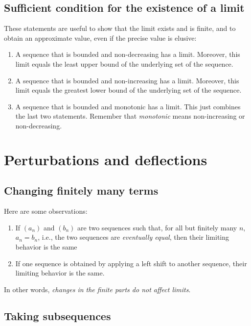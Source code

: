 \documentclass[10pt]{amsart}
\begin{document}
\subsection{Sufficient condition for the existence of a limit}

These statements are useful to show that the limit exists and is
finite, and to obtain an approximate value, even if the precise value
is elusive:

\begin{enumerate}
\item A sequence that is bounded and non-decreasing has a
  limit. Moreover, this limit equals the least upper bound of the
  underlying set of the sequence.
\item A sequence that is bounded and non-increasing has a
  limit. Moreover, this limit equals the greatest lower bound of the
  underlying set of the sequence.
\item A sequence that is bounded and monotonic has a limit. This just
  combines the last two statements. Remember that {\em monotonic}
  means non-increasing or non-decreasing.
\end{enumerate}

\section{Perturbations and deflections}

\subsection{Changing finitely many terms}

Here are some observations:

\begin{enumerate}
\item If $(a_n)$ and $(b_n)$ are two sequences such that, for all but
  finitely many $n$, $a_n = b_n$, i.e., the two sequences are {\em
  eventually equal}, then their limiting behavior is the same
\item If one sequence is obtained by applying a left shift to another
  sequence, their limiting behavior is the same.
\end{enumerate}

In other words, {\em changes in the finite parts do not affect
limits}.

\subsection{Taking subsequences}
\end{document}
